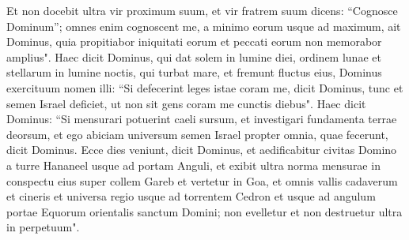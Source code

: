 \begin{biblechapter}
\verse Et non docebit ultra vir proximum suum, et vir fratrem suum dicens: “Cognosce Dominum”; omnes enim cognoscent me, a minimo eorum usque ad maximum, ait Dominus, quia propitiabor iniquitati eorum et peccati eorum non memorabor amplius". 
\verse Haec dicit Dominus, qui dat solem in lumine diei, ordinem lunae et stellarum in lumine noctis, qui turbat mare, et fremunt fluctus eius, Dominus exercituum nomen illi: 
\verse “Si defecerint leges istae coram me, dicit Dominus, tunc et semen Israel deficiet, ut non sit gens coram me cunctis diebus". 
\verse Haec dicit Dominus: “Si mensurari potuerint caeli sursum, et investigari fundamenta terrae deorsum, et ego abiciam universum semen Israel propter omnia, quae fecerunt, dicit Dominus. 
\verse Ecce dies veniunt, dicit Dominus, et aedificabitur civitas Domino a turre Hananeel usque ad portam Anguli, 
\verse et exibit ultra norma mensurae in conspectu eius super collem Gareb et vertetur in Goa, 
\verse et omnis vallis cadaverum et cineris et universa regio usque ad torrentem Cedron et usque ad angulum portae Equorum orientalis sanctum Domini; non evelletur et non destruetur ultra in perpetuum". 
\end{biblechapter}

